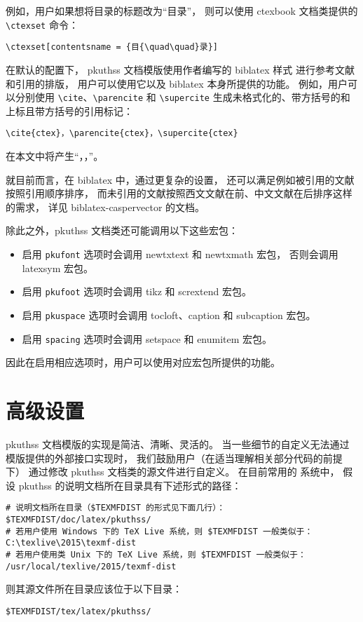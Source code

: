 例如，用户如果想将目录的标题改为“目{\quad\quad}录”，
则可以使用 ctexbook 文档类提供的 \verb|\ctexset| 命令：
\begin{Verbatim}
\ctexset[contentsname = {目{\quad\quad}录}]
\end{Verbatim}

在默认的配置下，%
pkuthss 文档模版使用作者编写的 biblatex 样式%
进行参考文献和引用的排版，
用户可以使用它以及 biblatex 本身所提供的功能。
例如，用户可以分别使用 \verb|\cite|、\verb|\parencite| 和 \verb|\supercite|
生成未格式化的、带方括号的和上标且带方括号的引用标记：
\begin{Verbatim}
\cite{ctex}，\parencite{ctex}，\supercite{ctex}
\end{Verbatim}
在本文中将产生“\cite{ctex}，\parencite{ctex}，\supercite{ctex}”。

就目前而言，在 biblatex 中，通过更复杂的设置，
还可以满足例如被引用的文献按照引用顺序排序，
而未引用的文献按照西文文献在前、中文文献在后排序这样的需求，
详见 biblatex-caspervector 的文档。

除此之外，pkuthss 文档类还可能调用以下这些宏包：
\begin{itemize}
	\item 启用 \verb|pkufont| 选项时会调用
		newtxtext 和 newtxmath 宏包，
		否则会调用 latexsym 宏包。
	\item 启用 \verb|pkufoot| 选项时会调用
		tikz 和 scrextend 宏包。
	\item 启用 \verb|pkuspace| 选项时会调用
		tocloft、caption 和
		subcaption 宏包。
	\item 启用 \verb|spacing| 选项时会调用 setspace 和
		enumitem 宏包。
\end{itemize}
因此在启用相应选项时，用户可以使用对应宏包所提供的功能。

\section{高级设置}\label{sec:advanced}

pkuthss 文档模版的实现是简洁、清晰、灵活的。
当一些细节的自定义无法通过模版提供的外部接口实现时，
我们鼓励用户（在适当理解相关部分代码的前提下）
通过修改 pkuthss 文档类的源文件进行自定义。
在目前常用的  系统中，
假设 pkuthss 的说明文档所在目录具有下述形式的路径：
\begin{Verbatim}
# 说明文档所在目录（$TEXMFDIST 的形式见下面几行）：
$TEXMFDIST/doc/latex/pkuthss/
# 若用户使用 Windows 下的 TeX Live 系统，则 $TEXMFDIST 一般类似于：
C:\texlive\2015\texmf-dist
# 若用户使用类 Unix 下的 TeX Live 系统，则 $TEXMFDIST 一般类似于：
/usr/local/texlive/2015/texmf-dist
\end{Verbatim}
则其源文件所在目录应该位于以下目录：
\begin{Verbatim}
$TEXMFDIST/tex/latex/pkuthss/
\end{Verbatim}

